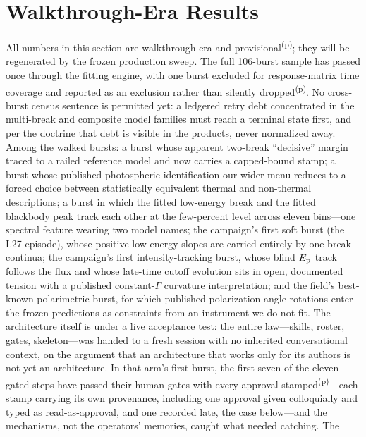 \documentclass[twocolumn]{aastex631}
\newcommand{\prov}{\textsuperscript{(p)}}
\newcommand{\Ep}{E_{\rm p}}
\begin{document}
\section{Walkthrough-Era Results} \label{sec:results}\label{sec:casestudy}
All numbers in this section are walkthrough-era and provisional\prov;
they will be regenerated by the frozen production sweep. The full
106-burst sample has passed once through the fitting engine, with one
burst excluded for response-matrix time coverage and reported as an
exclusion rather than silently dropped\prov. No cross-burst census
sentence is permitted yet: a ledgered retry debt concentrated in the
multi-break and composite model families must reach a terminal state
first, and per the doctrine that debt is visible in the products, never
normalized away. Among the walked bursts: a burst whose apparent two-break ``decisive''
margin traced to a railed reference model and now carries a capped-bound
stamp; a burst whose published photospheric identification our wider menu
reduces to a forced choice between statistically equivalent thermal and
non-thermal descriptions; a burst in which the fitted low-energy break and
the fitted blackbody peak track each other at the few-percent level across
eleven bins---one spectral feature wearing two model names; the campaign's
first soft burst (the L27 episode), whose positive low-energy slopes are
carried entirely by one-break continua; the campaign's first
intensity-tracking burst, whose blind $\Ep$ track follows the flux and whose
late-time cutoff evolution sits in open, documented tension with a published
constant-$\Gamma$ curvature interpretation; and the field's best-known
polarimetric burst, for which published polarization-angle rotations enter
the frozen predictions as constraints from an instrument we do not fit.
The architecture itself is under a live acceptance test: the entire
law---skills, roster, gates, skeleton---was handed to a fresh session
with no inherited conversational context, on the argument that an
architecture that works only for its authors is not yet an architecture.
In that arm's first burst, the first seven of the eleven gated steps have
passed their human gates with every approval stamped\prov{}---each stamp
carrying its own provenance, including one approval given colloquially and
typed as read-as-approval, and one recorded late, the case below---and the
mechanisms, not the operators' memories, caught what needed catching. The
\end{document}
